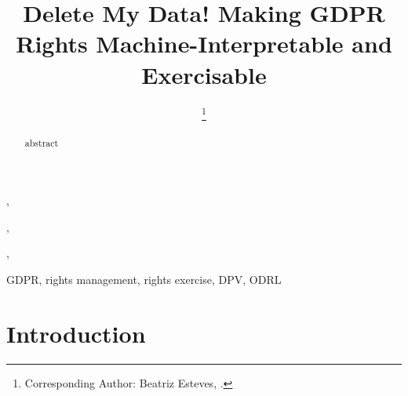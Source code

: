 \documentclass{IOS-Book-Article}     %
\begin{document}
\begin{frontmatter}          %
%
\title{Delete My Data! Making GDPR Rights Machine-Interpretable and Exercisable}

\author[A]{ 
\thanks{Corresponding Author: Beatriz Esteves, .}},
\author[B]{ },
\author[C]{ },
\author[D]{ }
\address[A]{IDLab, Ghent University -- imec, Ghent, Belgium}
\address[B]{ADAPT Centre, Dublin City University, Dublin, Ireland}
\address[C]{Signatu AS, Oslo, Norway}
\address[D]{ADAPT Centre, Dublin City University, and Uniphar PLC, Dublin, Ireland}

\begin{abstract}
abstract
\end{abstract}

\begin{keyword}
GDPR, rights management, rights exercise, DPV, ODRL
\end{keyword}

\end{frontmatter}

\section{Introduction}
\label{sec:intro}
\end{document}
